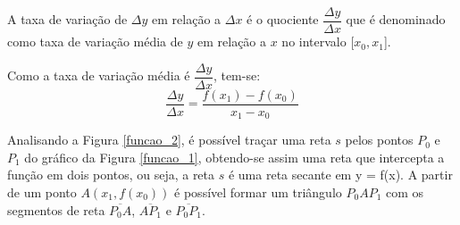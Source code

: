 \documentclass[
	12pt,				%
	openright,			%
    twoside,			%
	a4paper,			%
	chapter=TITLE,		%
	english,			%
	french,				%
	spanish,			%
	brazil				%
	]{abntex2}
\numberwithin{lema}{chapter}
\numberwithin{teorema}{chapter}
\numberwithin{definicao}{chapter}
\numberwithin{exemplo}{chapter}
\numberwithin{figure}{chapter}
\begin{document}
A taxa de variação de $\Delta y$ em relação a $\Delta x$ é o quociente $\dfrac{\Delta y}{\Delta x}$ que é denominado como taxa de variação média de $y$ em relação a $x$ no intervalo [$x_0, x_1$].

Como a taxa de variação média é $\dfrac{\Delta y}{\Delta x}$, tem-se:
\begin{equation} 
	\label{taxa_med}	
	\frac{\Delta y}{\Delta x} = \frac{f(x_1) - f(x_0)}{x_1 - x_0}	
\end{equation}

Analisando a Figura \ref{funcao_2}, é possível traçar uma reta $s$ pelos pontos $P_0$ e $P_1$ do gráfico da Figura \ref{funcao_1}, obtendo-se assim uma reta que intercepta a função em dois pontos, ou seja, a reta $s$ é uma reta secante em y = f(x). A partir de um ponto $A(x_1, f(x_0))$ é possível formar um triângulo $P_0AP_1$ com os segmentos de reta $\overline{P_0A}$, $\overline{AP_1}$ e $\overline{P_0P_1}$.
\end{document}
